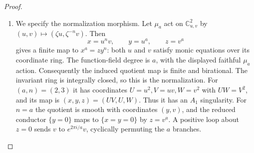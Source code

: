 \begin{proof}
\begin{enumerate}[label={$\langle1\rangle$\arabic*.},leftmargin=*]
\item We specify the normalization morphism. Let $\mu_a$ act on
$\mathbb C^2_{u,v}$ by $(u,v)\mapsto(\zeta u,\zeta^{-n}v)$.
Then
\[
 x=u^nv,\qquad y=u^a,\qquad z=v^a
\]
gives a finite map to $x^a=zy^n$: both $u$ and $v$ satisfy
monic equations over its coordinate ring. The function-field
degree is $a$, with the displayed faithful $\mu_a$ action.
Consequently the induced quotient map is finite and birational.
The invariant ring is integrally closed, so this is the
normalization. For $(a,n)=(2,3)$ it has coordinates
$U=u^2,V=uv,W=v^2$ with $UW=V^2$, and its map is
$(x,y,z)=(UV,U,W)$. Thus it has an $A_1$ singularity.
For $n=a$ the quotient is smooth with coordinates $(y,v)$,
and the reduced conductor $\{y=0\}$ maps to $\{x=y=0\}$
by $z=v^a$. A positive loop about $z=0$ sends $v$ to
$e^{2\pi i/a}v$, cyclically permuting the $a$ branches.

\end{enumerate}
\end{proof}